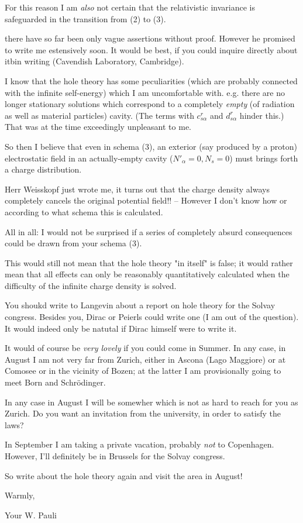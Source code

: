 \documentclass{article}
\begin{document}
For this reason I am \textit{also} not certain that the relativistic invariance is safeguarded in the transition from (2) to (3).

 there have so far been only vague assertions without proof. However he promised to write me estensively soon. It would be best, if you could inquire directly about itbin writing (Cavendish Laboratory, Cambridge).

I know that the hole theory has some peculiarities (which are probably connected with the infinite self-energy) which I am uncomfortable with. e.g. there are no longer stationary solutions which correspond to a completely \textit{empty} (of radiation as well as material particles) cavity. (The terms with $c^r_{s\alpha}$ and $d^r_{s\alpha}$ hinder this.) That was at the time exceedingly unpleasant to me.

So then I believe that even in schema (3), an exterior (say produced by a proton) electrostatic field in an actually-empty cavity ($N'_\alpha=0, N_s=0$) must brings forth a charge distribution.

Herr Weisskopf just wrote me, it turns out that the charge density always completely cancels the original potential field!! -- However I don't know how or according to what schema this is calculated.

All in all: I would not be surprised if a series of completely absurd consequences could be drawn from your schema (3).

This would still not mean that the hole theory "in itself" is false; it would rather mean that all effects can only be reasonably quantitatively calculated when the difficulty of the infinite charge density is solved.

You shoukd write to Langevin about a report on hole theory for the Solvay congress. Besides you, Dirac or Peierls could write one (I am out of the question). It would indeed only be natutal if Dirac himself were to write it.

It would of course be \textit{very lovely} if you could come in Summer. In any case, in August I am not very far from Zurich, either in Ascona (Lago Maggiore) or at Comosee or in the vicinity of Bozen; at the latter I am provisionally going to meet Born and Schr\"odinger.

In any case in August I will be somewher which is not as hard to reach for you as Zurich. Do you want an invitation from the university, in order to satisfy the laws?

In September I am taking a private vacation, probably \textit{not} to Copenhagen. However, I'll definitely be in Brussels for the Solvay congress.

So write about the hole theory again and visit the area in August!

Warmly,

Your W. Pauli
\end{document}
